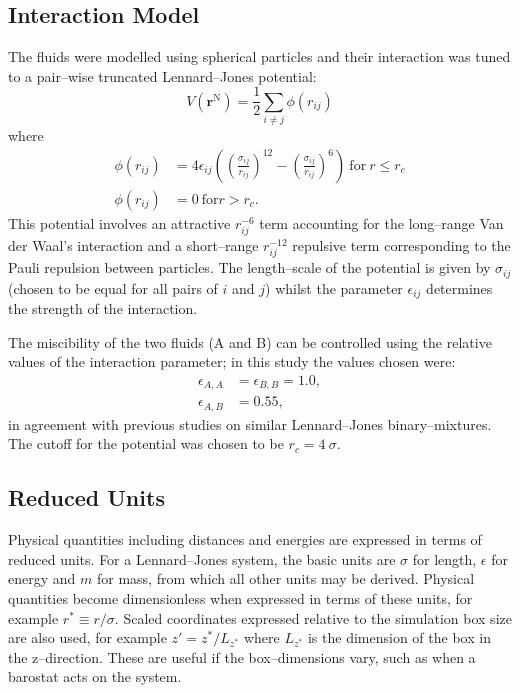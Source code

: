 \subsection{Interaction Model}\label{InteractionModel}
The fluids were modelled using spherical particles and their interaction was tuned to a pair--wise truncated Lennard--Jones potential:
\begin{equation}
V \left( \mathbf{r}^{\mathrm{N}} \right) = \frac{1}{2} \sum_{i\neq j} \phi \left( r_{ij} \right)
\end{equation}
where
\begin{align}
\label{LJ}
\phi \left( r_{ij} \right) &= 4 \epsilon_{ij} \left( \left( \frac{\sigma_{ij}}{r_{ij}}\right)^{12} - \left( \frac{\sigma_{ij}}{r_{ij}}\right)^{6} \right)\ \mathrm{for}\ r \leq r_{c}\\
\phi \left( r_{ij} \right) &= 0\ \mathrm{for} r > r_{c}.
\end{align}
This potential involves an attractive $r_{ij}^{-6}$ term accounting for the long--range Van der Waal's interaction and a short--range $r_{ij}^{-12}$ repulsive term corresponding to the Pauli repulsion between particles.
The length--scale of the potential is given by $\sigma_{ij}$ (chosen to be equal for all pairs of $i$ and $j$) whilst the parameter $\epsilon_{ij}$ determines the strength of the interaction. 

The miscibility of the two fluids (A and B) can be controlled using the relative values of the interaction parameter; in this study the values chosen were:
\begin{align}
\epsilon_{A,A} &= \epsilon_{B,B} = 1.0,\\
\epsilon_{A,B} &= 0.55,
\end{align}
in agreement with previous studies on similar Lennard--Jones binary--mixtures.\cite{MorenzoRazo,Blas,HolgerBoppHampe}
The cutoff for the potential was chosen to be $r_{c} = 4\ \sigma$.

\subsection{Reduced Units}\label{ReducedUnits}
Physical quantities including distances and energies are expressed in terms of reduced units.
For a Lennard--Jones system, the basic units are $\sigma$ for length, $\epsilon$ for energy and $m$ for mass, from which all other units may be derived.\cite{FrenkelSmit}
Physical quantities become dimensionless when expressed in terms of these units, for example $r^{*} \equiv r / \sigma$.
Scaled coordinates expressed relative to the simulation box size are also used, for example $z' = z^{*} / L_{z^{*}}$ where $L_{z^{*}}$ is the dimension of the box in the z--direction.
These are useful if the box--dimensions vary, such as when a barostat acts on the system.


